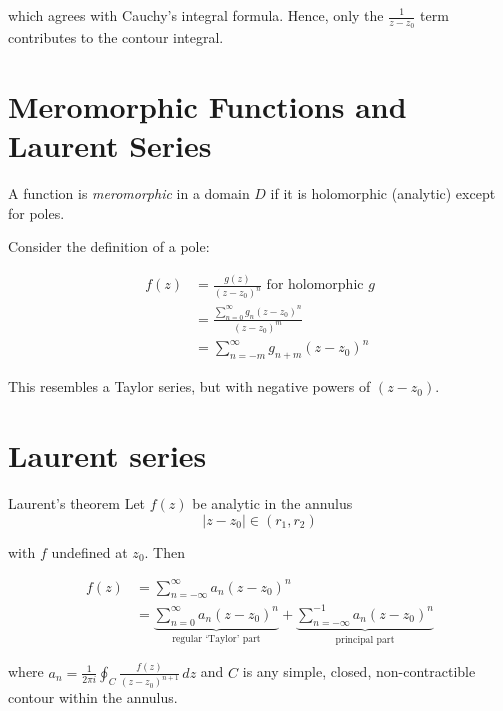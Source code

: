 \documentclass{../../physics_notes}
\begin{document}

which agrees with Cauchy's integral formula. Hence, only the $\frac{1}{z - z_0}$ term contributes to the contour integral. 

\section{Meromorphic Functions and Laurent Series}

A function is \emph{meromorphic} in a domain $D$ if it is holomorphic (analytic) except for poles. 

Consider the definition of a pole:

\begin{align*}
f(z) &= \frac{g(z)}{(z - z_0)^n} \text{ for holomorphic } g \\
&= \frac{\sum^\infty_{n=0}g_n (z-z_0)^n}{(z-z_0)^m} \\
&= \sum_{n=-m}^\infty g_{n+m} (z - z_0)^n
\end{align*}

This resembles a Taylor series, but with negative powers of $(z-z_0)$.

\section{Laurent series }

\begin{theorem}{Laurent's theorem}
Let $f(z)$ be analytic in the annulus
\[ {|z-z_0| \in (r_1 , r_2)} \]

with $f$ undefined at $z_0$. Then

\begin{align*}
f(z) &= \sum_{n=-\infty}^\infty a_n (z-z_0)^n \\
&= \underbrace{\sum_{n=0}^\infty a_n (z-z_0)^n}_\text{regular `Taylor' part} + \underbrace{\sum_{n=-\infty}^{-1} a_{n}(z-z_0)^n}_\text{principal part}
\end{align*}

where $a_n = \frac{1}{2\pi i} \oint_C \frac{f(z)}{(z-z_0)^{n+1}}\, dz$ and $C$ is any simple, closed, non-contractible contour within the annulus.

\end{theorem}
\end{document}
